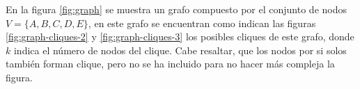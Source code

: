 En la figura \ref{fig:graph} se muestra un grafo compuesto por el conjunto de nodos \\$V=\{A, B, C, D, E\}$, en este grafo se encuentran como indican las figuras \ref{fig:graph-cliques-2} y \ref{fig:graph-cliques-3} los posibles cliques de este grafo, donde $k$ indica el número de nodos del clique. Cabe resaltar, que los nodos por si solos también forman clique, pero no se ha incluido para no hacer más compleja la figura.

\begin{figure}[H]
	\centering	

\end{figure}
